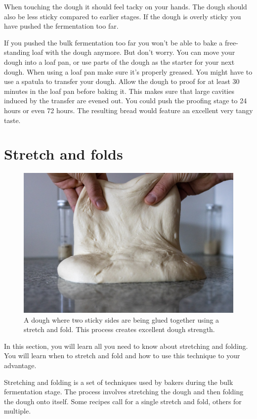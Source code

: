 When touching the dough it should feel tacky
on your hands. The dough should also be less sticky
compared to earlier stages. If the dough is overly
sticky you have pushed the fermentation too far.

If you pushed the bulk fermentation too far you won't be able
to bake a free-standing loaf with the dough anymore. But don't
worry. You can move your dough into a loaf pan, or use parts
of the dough as the starter for your next dough. When using
a loaf pan make sure it's properly greased. You might have
to use a spatula to transfer your dough. Allow the dough
to proof for at least 30 minutes in the loaf pan before
baking it. This makes sure that large cavities induced
by the transfer are evened out. You could push the proofing
stage to 24 hours or even 72 hours. The resulting
bread would feature an excellent very tangy taste.


\section{Stretch and folds}

\begin{figure}[!htb]
  \includegraphics[width=\textwidth]{dough-being-glued}
  \caption{A dough where two sticky sides are being glued together using
  a stretch and fold. This process creates excellent dough strength.}
\end{figure}

In this section, you will learn all you need to know about stretching and
folding. You will learn when to stretch and fold and how to use this technique
to your advantage.

Stretching and folding is a set of techniques used by bakers during the bulk
fermentation stage. The process involves stretching the dough and then
folding the dough onto itself. Some recipes call for a single stretch
and fold, others for multiple.

